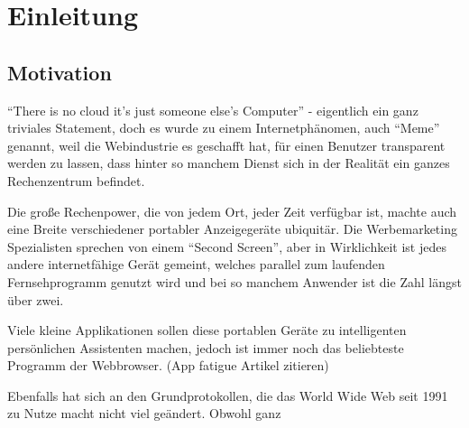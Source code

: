 \chapter{Einleitung}

\section{Motivation}

 ``There is no cloud it's just someone else's Computer'' - eigentlich ein ganz
 triviales Statement, doch es wurde zu einem Internetphänomen, auch ``Meme''
 genannt, weil die Webindustrie es geschafft hat, für einen Benutzer
 transparent werden zu lassen, dass hinter so manchem Dienst sich in der Realität ein ganzes Rechenzentrum befindet.


Die große Rechenpower, die von jedem Ort, jeder Zeit verfügbar ist, machte auch
eine Breite verschiedener portabler Anzeigegeräte ubiquitär. Die Werbemarketing
Spezialisten sprechen von einem ``Second Screen'', aber in Wirklichkeit ist
jedes andere internetfähige Gerät gemeint, welches parallel zum laufenden
Fernsehprogramm genutzt wird und bei so manchem Anwender ist die Zahl
längst über zwei.


Viele kleine Applikationen sollen diese portablen Geräte zu intelligenten
persönlichen Assistenten machen, jedoch ist immer noch das beliebteste Programm
der Webbrowser. (App fatigue Artikel zitieren)


Ebenfalls hat sich an den Grundprotokollen, die das World Wide Web seit 1991 zu
Nutze macht nicht viel geändert. Obwohl ganz


